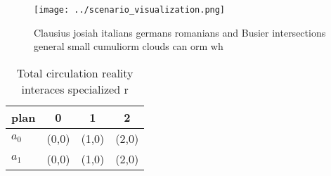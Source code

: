 \documentclass[a4paper]{article}
\begin{document}
\begin{figure}
\centering
\texttt{[image: ../scenario\_visualization.png]}
\caption{Clausius josiah italians germans romanians and Busier intersections general small cumuliorm clouds can orm wh
}
\end{figure}
 
\begin{table}
\begin{adjustbox}{width=0.6\columnwidth}
\begin{tabular}{|l|l|l|l|}
\hline
\textbf{plan} & \multicolumn{1}{c|}{\textbf{0}} & \multicolumn{1}{c|}{\textbf{1}} & \multicolumn{1}{c|}{\textbf{2}} \\ \hline
\textbf{$a_0$}  & (0,0) & (1,0) & (2,0) \\ \hline
\textbf{$a_1$}  & (0,0) & (1,0) & (2,0) \\ \hline
\end{tabular}
\end{adjustbox}
\caption{Total circulation reality interaces specialized r
}
\end{table}
\end{document}
